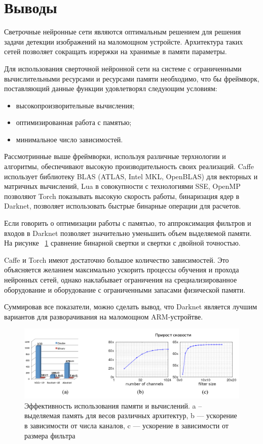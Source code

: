 \documentclass[a4paper,english,russian]{G2-105}
\begin{document}
\section{Выводы} \ttl
\par Светрочные нейронные сети являются оптимальным решением для решения задачи детекции изображений на маломощном устройсте. Архитектура таких сетей позволяет сокращать изрержки на хранимые в памяти параметры.
\par Для использования сверточной нейронной сети на системе с ограниченными вычислительными ресурсами и ресурсами памяти необходимо, что бы фреймворк, поставляющий данные функции удовлетворял следующим условиям:
\begin{itemize}
\item высокопроизворительные вычисления;
\item оптимизированная работа с памятью;
\item минимальное число зависимостей.
\end{itemize}
\par Рассмотринные выше фреймворки, используя различные терхнологии и алгоритмы, обеспечивают высокую производительность своих реализаций. Caffe использует библиотеку BLAS (ATLAS, Intel MKL, OpenBLAS) для векторных и матричных вычислений, Lua в совокупности с технологиями SSE, OpenMP позволяют Torch показывать высокую скорость работы, бинаризация ядер в Darknet, позволяет использовать быстрые бинарные операции для расчетов.
\par Если говорить о оптимизации работы с памятью, то аппроксимация фильтров и входов в Darknet позволяет значительно уменьшить объем выделяемой памяти. На рисунке ~\ref{binary_conv} сравнение бинарной свертки и свертки с двойной точностью.
\par Caffe и Torch имеют достаточно большое количество зависимостей. Это объясняется желанием максимально ускорить процессы обучения и прохода нейронных сетей, однако наклабывает ограничения на срециализированное оборудование и оборудование с ограниченными запасами физической памяти.
\par Суммировав все показатели, можно сделать вывод, что Darknet является лучшим вариантов для разворачивания на маломощном ARM-устройтве.
\begin{figure}
\begin{center}
    \includegraphics[width=\linewidth]{binary_conv.png}
    \caption{Эффективность использования памяти и вычислений. a -- выделяемая память для весов различных архитектур, b --- ускорение в зависимости от числа каналов, c --- ускорение в зависимости от размера фильтра}
	\label{binary_conv}
\end{center}
\end{figure}
\end{document}
